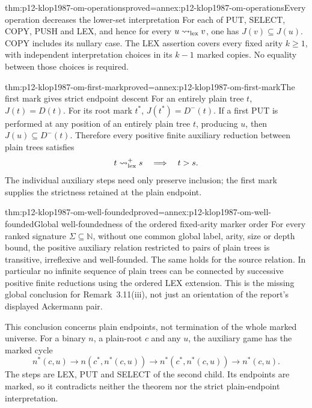 \begin{hblemma}{thm:p12-klop1987-om-operations}{proved=annex:p12-klop1987-om-operations}{Every operation decreases the lower-set interpretation}
For each of PUT, SELECT, COPY, PUSH and LEX, and hence for every
\(u\rightsquigarrow_{\rm lex}v\), one has \(J(v)\subseteq J(u)\).
COPY includes its nullary case. The LEX assertion covers every fixed
arity \(k\geq1\), with independent interpretation choices in its
\(k-1\) marked copies. No equality between those choices is required.
\end{hblemma}

\begin{hblemma}{thm:p12-klop1987-om-first-mark}{proved=annex:p12-klop1987-om-first-mark}{The first mark gives strict endpoint descent}
For an entirely plain tree \(t\), \(J(t)=D(t)\). For its root
mark \(t^*\), \(J(t^*)=D^-(t)\). If a first PUT is performed
at any position of an entirely plain tree \(t\), producing \(u\),
then \(J(u)\subseteq D^-(t)\). Therefore every positive finite
auxiliary reduction between plain trees satisfies
\[
 t\rightsquigarrow_{\rm lex}^{+}s\quad\Longrightarrow\quad t>s.
\]
The individual auxiliary steps need only preserve inclusion; the
first mark supplies the strictness retained at the plain endpoint.
\end{hblemma}

\begin{hbtheorem}{thm:p12-klop1987-om-well-founded}{proved=annex:p12-klop1987-om-well-founded}{Global well-foundedness of the ordered fixed-arity marker order}
For every ranked signature \(\Sigma\subseteq\mathbb N\), without
one common global label, arity, size or depth bound, the positive
auxiliary relation restricted to pairs of plain trees is transitive,
irreflexive and well-founded. The same holds for the source relation.
In particular no infinite sequence of plain trees can be connected by
successive positive finite reductions using the ordered LEX extension.
This is the missing global conclusion for Remark~3.11(iii), not just
an orientation of the report's displayed Ackermann pair.
\end{hbtheorem}

This conclusion concerns plain endpoints, not termination of the whole
marked universe. For a binary \(n\), a plain-root \(c\) and any
\(u\), the auxiliary game has the marked cycle
\[
 n^*(c,u)\longrightarrow n(c^*,n^*(c,u))
 \longrightarrow n^*(c^*,n^*(c,u))\longrightarrow n^*(c,u).
\]
The steps are LEX, PUT and SELECT of the second child. Its endpoints
are marked, so it contradicts neither the theorem nor the strict
plain-endpoint interpretation.

